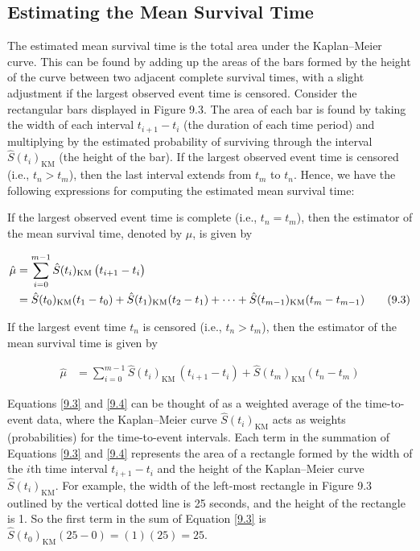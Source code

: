 \documentclass[
]{book}
\begin{document}
\hypertarget{estimating-the-mean-survival-time}{%
\subsection*{Estimating the Mean Survival Time}\label{estimating-the-mean-survival-time}}

The estimated mean survival time is the total area under the Kaplan--Meier curve. This can be found by adding up the areas of the bars formed by the height of the curve between two adjacent complete survival times, with a slight adjustment if the largest observed event time is censored. Consider the rectangular bars displayed in Figure 9.3. The area of each bar is found by taking the width of each interval \(t_{i+1} - t_i\) (the duration of each time period) and multiplying by the estimated probability of surviving through the interval \(\hat S(t_i)_{\mathrm{KM}}\) (the height of the bar). If the largest observed event time is censored (i.e., \(t_n > t_m\)), then the last interval extends from \(t_m\) to \(t_n\). Hence, we have the following expressions for computing the estimated mean survival time:

If the largest observed event time is complete (i.e., \(t_n = t_m\)), then the estimator of the mean survival time, denoted by \(\hat \mu\), is given by

\begin{align}\label{9.3}
\hat \mu 
&= \sum_{i=0}^{m-1} \hat S(t_i)_{\mathrm{KM}} \,\bigl(t_{i+1} - t_i\bigr) \notag \\
&= \hat S(t_0)_{\mathrm{KM}}(t_1 - t_0) + \hat S(t_1)_{\mathrm{KM}}(t_2 - t_1) + \dots + \hat S(t_{m-1})_{\mathrm{KM}}(t_m - t_{m-1})
\tag{9.3}
\end{align}

If the largest event time \(t_n\) is censored (i.e., \(t_n > t_m\)), then the estimator of the mean survival time is given by

\begin{align}\label{9.4}
\hat \mu 
&= \sum_{i=0}^{m-1} \hat S(t_i)_{\mathrm{KM}} \,(t_{i+1} - t_i) + \hat S(t_m)_{\mathrm{KM}}(t_n - t_m)
\tag{9.4}
\end{align}

Equations \ref{9.3} and \ref{9.4} can be thought of as a weighted average of the time-to-event data, where the Kaplan--Meier curve \(\hat S(t_i)_{\mathrm{KM}}\) acts as weights (probabilities) for the time-to-event intervals. Each term in the summation of Equations \ref{9.3} and \ref{9.4} represents the area of a rectangle formed by the width of the \(i\)th time interval \(t_{i+1} - t_i\) and the height of the Kaplan--Meier curve \(\hat S(t_i)_{\mathrm{KM}}\). For example, the width of the left-most rectangle in Figure 9.3 outlined by the vertical dotted line is 25 seconds, and the height of the rectangle is 1. So the first term in the sum of Equation \ref{9.3} is \(\hat S(t_0)_{\mathrm{KM}}(25 - 0) = (1)(25) = 25\).
\end{document}
